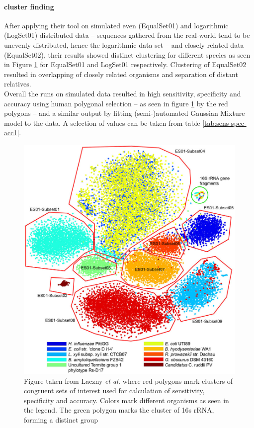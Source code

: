 \documentclass[twocolumn]{bmcart}%
\begin{document}
\paragraph*{cluster finding}
After applying their tool on simulated even (EqualSet01) and logarithmic (LogSet01) distributed data -- sequences gathered from the real-world tend to be unevenly distributed, hence the logarithmic data set -- and closely related data (EqualSet02), their results showed distinct clustering for different species as seen in Figure \ref{img:clusterData1} for EqualSet01 and LogSet01 respectively. Clustering of EqualSet02 resulted in overlapping of closely related organisms and separation of distant relatives. \\
Overall the runs on simulated data resulted in high sensitivity, specificity and accuracy using human polygonal selection -- as seen in figure \ref{img:clusterData1} by the red polygons -- and a similar output by fitting (semi-)automated Gaussian Mixture model to the data. A selection of values can be taken from table \ref{tab:sens-spec-acc1}.
\begin{figure}
	\centering
	\includegraphics[width=.98\linewidth]{bilder/clusterData1.jpg}
	\caption{Figure taken from Laczny \textit{et al.} \cite{Laczny2014} where red polygons mark clusters of congruent sets of interest used for calculation of sensitivity, specificity and accuracy. Colors mark different organisms as seen in the legend. The green polygon marks the cluster of 16s rRNA, forming a distinct group}
	\label{img:clusterData1}
\end{figure}
\end{document}
